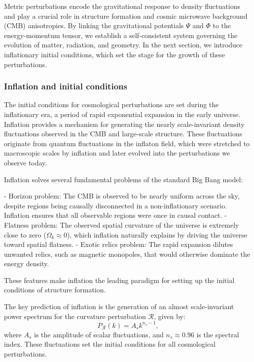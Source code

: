\documentclass{aa}
\begin{document}
Metric perturbations encode the gravitational response to density fluctuations and play a crucial role in structure formation and cosmic microwave background (CMB) anisotropies. By linking the gravitational potentials $\Psi$ and $\Phi$ to the energy-momentum tensor, we establish a self-consistent system governing the evolution of matter, radiation, and geometry. In the next section, we introduce inflationary initial conditions, which set the stage for the growth of these perturbations.
\color{black}






\subsubsection{Inflation and initial conditions}
\color{Plum}
The initial conditions for cosmological perturbations are set during the inflationary era, a period of rapid exponential expansion in the early universe. Inflation provides a mechanism for generating the nearly scale-invariant density fluctuations observed in the CMB and large-scale structure. These fluctuations originate from quantum fluctuations in the inflaton field, which were stretched to macroscopic scales by inflation and later evolved into the perturbations we observe today.

Inflation solves several fundamental problems of the standard Big Bang model:

- Horizon problem: The CMB is observed to be nearly uniform across the sky, despite regions being causally disconnected in a non-inflationary scenario. Inflation ensures that all observable regions were once in causal contact.
- Flatness problem: The observed spatial curvature of the universe is extremely close to zero ($\Omega_k \approx 0$), which inflation naturally explains by driving the universe toward spatial flatness.
- Exotic relics problem: The rapid expansion dilutes unwanted relics, such as magnetic monopoles, that would otherwise dominate the energy density.

These features make inflation the leading paradigm for setting up the initial conditions of structure formation.

The key prediction of inflation is the generation of an almost scale-invariant power spectrum for the curvature perturbation $ \mathcal{R} $, given by:
\begin{equation}
P_\mathcal{R}(k) = A_s k^{n_s - 1},
\end{equation}
where $ A_s $ is the amplitude of scalar fluctuations, and $ n_s \approx 0.96 $ is the spectral index. These fluctuations set the initial conditions for all cosmological perturbations.
\end{document}
